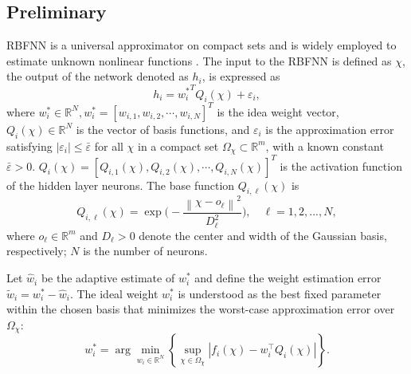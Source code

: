 \documentclass[pdflatex,sn-mathphys-num]{sn-jnl}%
\theoremstyle{thmstyleone}%
\theoremstyle{thmstyletwo}%
\theoremstyle{thmstylethree}%
\begin{document}
\subsection{Preliminary}
\par RBFNN is a universal approximator on compact sets and is widely employed to estimate unknown nonlinear functions \cite{SunEtAl_2022_NeuralNetworkBased, SongZhou_2018_NeuroadaptiveControl}. The input to the RBFNN is defined as $\chi$, the output of the network denoted as $h_i$, is expressed as
\begin{equation}
	h_i={w_i^*}^{T} { Q_i} (\chi)+\varepsilon_i, 
	\label{eq:4}
\end{equation}
where ${{w_i^*}}\in \mathbb{R}^N, w_i^*=[{{w}_{i,1}},{{w}_{i,2}},\cdots,{{w}_{i,N}}]^{T}$ is the idea weight vector, $Q_i(\chi)\!\in\mathbb{R}^N$ is the vector of basis functions, and $\varepsilon_i$ is the approximation error satisfying $|\varepsilon_i|\le \bar\varepsilon$ for all $\chi$ in a compact set $\Omega_\chi\subset\mathbb{R}^m$, with a known constant $\bar\varepsilon>0$. ${ Q_i}(\chi)=[{{ Q}_{i,1}( \chi )}, {{ Q_{i,2}}( \chi )}, \cdots,{{ Q_{i,N}}( \chi )}]^{T}$ is the activation function of the hidden layer neurons. The base function \( { Q}_{i,\ell }( \chi ) \) is
\begin{equation}
	{ Q}_{i,\ell}( \chi ) =\operatorname{exp} \biggl(-\frac{\left\| \chi-o_{\ell} \right\|^2} { D_{\ell}^2} \biggr), \quad \ell=1, 2,..., N,
	\label{eq:5}
\end{equation}
where $o_\ell\in\mathbb{R}^m$ and $D_\ell>0$ denote the center and width of the Gaussian basis, respectively; $N$ is the number of neurons.

\par Let $\hat w_i$ be the adaptive estimate of $w_i^*$ and define the weight estimation error $\tilde w_i= w_i^*-\hat w_i$. The ideal weight $w_i^*$ is understood as the best fixed parameter within the chosen basis that minimizes the worst-case approximation error over $\Omega_\chi$:
\begin{equation}
	w_i^* = \arg \min_{w_i \in \mathbb{R}^N} \left\{ \sup_{\chi \in \Omega_\chi} | f_i(\chi) - w_i^{\top}  Q_i(\chi) | \right\}.
	\label{eq:6}
\end{equation}
\end{document}
